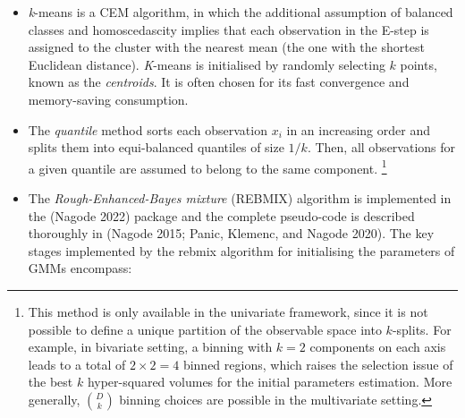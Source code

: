 \begin{itemize}
\item
  \emph{k}-means is a CEM algorithm, in which the additional assumption of
  balanced classes and homoscedascity implies that each observation in
  the E-step is assigned to the cluster with the nearest mean (the one
  with the shortest Euclidean distance). \emph{K}-means is initialised by randomly selecting \(k\) points, known as the \emph{centroids}. It is often chosen for its fast convergence and memory-saving consumption.
\item
  The \emph{quantile} method sorts each observation \(x_i\) in an increasing
  order and splits them into equi-balanced quantiles of size \(1/k\). Then, all
  observations for a given quantile are assumed to belong to the same
  component. \footnote{This method is only available in the univariate framework,
  since it is not possible to define a unique partition of the observable space into $k$-splits. For example, in bivariate setting, a binning with $k=2$ components on each axis leads to a total of $2 \times 2=4$ binned regions, which raises the selection issue of the best $k$ hyper-squared volumes for the initial parameters estimation. More generally, $\binom{D}{k}$ binning choices are possible in the multivariate setting.}
\item
  The \emph{Rough-Enhanced-Bayes mixture} (REBMIX) algorithm is implemented in the  (Nagode 2022) package and the complete
  pseudo-code is described thoroughly in (Nagode 2015; Panic, Klemenc, and Nagode 2020). The key stages implemented by the rebmix algorithm for initialising the parameters of GMMs encompass:


\end{itemize}

